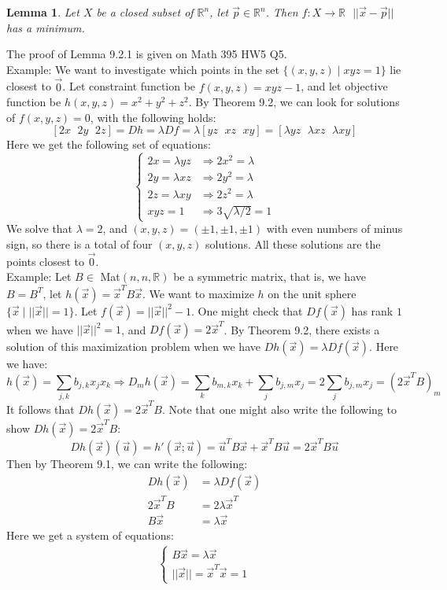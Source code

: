 \documentclass[11pt,oneside]{book}
\theoremstyle{break}
\theoremstyle{break}
\newtheorem{lem}{Lemma}[thm]
\newcommand{\R}{\mathbb{R}}
\newcommand{\example}{\color{green}Example: \color{black}}
\begin{document}
\begin{lem}
Let $X$ be a closed subset of $\R^n$, let $\vec{p}\in \R^n$. Then $f:X \to \R \ \ \ ||\vec{x}-\vec{p}||$ has a minimum. 
\end{lem}
The proof of Lemma 9.2.1 is given on Math 395 HW5 Q5.\\

\example We want to investigate which points in the set $\{(x,y,z) \mid xyz=1\}$ lie closest to $\vec{0}$. Let constraint function be $f(x,y,z) = xyz-1$, and let objective function be $h(x,y,z) = x^2+y^2+z^2$. By Theorem 9.2, we can look for solutions of $f(x,y,z)=0$, with the following holds: 
$$[2x\ \ \, 2y \ \ \, 2z]=Dh = \lambda Df = \lambda[yz\ \ \, xz\ \ \, xy] = [\lambda yz \ \ \, \lambda xz \ \ \, \lambda xy]$$
Here we get the following set of equations:
$$\begin{cases}2x=\lambda yz &\Rightarrow 2x^2 = \lambda\\ 2y=\lambda xz &\Rightarrow 2y^2 = \lambda\\ 2z = \lambda xy &\Rightarrow 2z^2 = \lambda \\ xyz = 1 &\Rightarrow 3\sqrt{\lambda/2}=1  \end{cases}$$
We solve that $\lambda = 2$, and $(x,y,z) = (\pm 1, \pm 1, \pm 1)$ with even numbers of minus sign, so there is a total of four $(x,y,z)$ solutions. All these solutions are the points closest to $\vec{0}$.\\

\example
Let $B\in $ Mat$(n,n,\R)$ be a symmetric matrix, that is, we have $B = B^T$, let $h(\vec{x}) = \vec{x}^T B \vec{x}$. We want to maximize $h$ on the unit sphere $\{\vec{x}\mid ||\vec{x}|| = 1\}$. Let $f(\vec{x}) = ||\vec{x}||^2 - 1$. One might check that $Df(\vec{x})$ has rank $1$ when we have $||\vec{x}||^2 = 1$, and $Df(\vec{x}) = 2\vec{x}^T$. By Theorem 9.2, there exists a solution of this maximization problem when we have $Dh(\vec{x}) = \lambda Df(\vec{x})$. Here we have: 
$$h(\vec{x}) = \sum_{j,k} b_{j,k}x_{j}x_{k} \Rightarrow D_mh(\vec{x}) = \sum_{k} b_{m,k}x_k + \sum_{j} b_{j,m} x_j = 2\sum_{j} b_{j,m}x_j=(2\vec{x}^TB)_m$$ It follows that $Dh(\vec{x}) = 2\vec{x}^TB$. Note that one might also write the following to show $Dh(\vec{x}) = 2\vec{x}^TB$:\\
$$Dh(\vec{x}) (\vec{u}) = h'(\vec{x};\vec{u}) = \vec{u}^TB\vec{x}+ \vec{x}^TB\vec{u} = 2\vec{x}^TB\vec{u}$$
Then by Theorem 9.1, we can write the following:
\begin{align*}
Dh(\vec{x}) &= \lambda Df(\vec{x})\\
2\vec{x}^TB &= 2\lambda \vec{x}^T\\
B\vec{x} &= \lambda \vec{x}
\end{align*}
Here we get a system of equations:
\begin{align*}
\begin{cases}B\vec{x} = \lambda\vec{x} \\  ||\vec{x}|| = \vec{x}^T\vec{x}=1  \end{cases} \tag{S1}
\end{align*}
\end{document}
